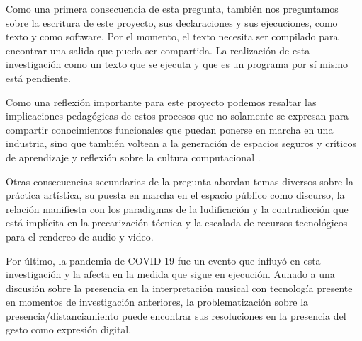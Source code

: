 \documentclass[12pt,letterpaper, twoside, openright,
headinclude,footinclude,BCOR5mm,
numbers=noenddot,cleardoublepage=empty,
tablecaptionabove]{article}
\begin{document}
Como una primera consecuencia de esta pregunta, también nos preguntamos sobre la escritura de este proyecto, sus declaraciones y sus ejecuciones, como texto y como software. Por el momento, el texto necesita ser compilado para encontrar una salida que pueda ser compartida. La realización de esta investigación como un texto que se ejecuta y que es un programa por sí mismo \citep{antitesis} está pendiente.

Como una reflexión importante para este proyecto podemos resaltar las implicaciones pedagógicas de estos procesos que no solamente se expresan para compartir conocimientos funcionales que puedan ponerse en marcha en una industria, sino que también voltean a la generación de espacios seguros y críticos de aprendizaje y reflexión sobre la cultura computacional \citep{soonKnotts}.

Otras consecuencias secundarias de la pregunta abordan temas diversos sobre la práctica artística, su puesta en marcha en el espacio público como discurso, la relación manifiesta con los paradigmas de la ludificación y la contradicción que está implícita en la precarización técnica y la escalada de recursos tecnológicos para el rendereo de audio y video. 


Por último, la pandemia de COVID-19 fue un evento que influyó en esta investigación y la afecta en la medida que sigue en ejecución. Aunado a una discusión sobre la presencia en la interpretación musical con tecnología presente en momentos de investigación anteriores, la problematización sobre la presencia/distanciamiento puede encontrar sus resoluciones en la presencia del gesto como expresión digital. 




{} 

\end{document}
